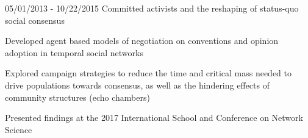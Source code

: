 \begin{cventries}
  \cventry
    {} %
    {} %
    {} %
    {05/01/2013 - 10/22/2015} %
    {Committed activists and the reshaping of status-quo social consensus}
    {
      \begin{cvitems} %
      	\item {Developed agent based models of negotiation on conventions and opinion adoption in temporal social networks}
        \item {Explored campaign strategies to reduce the time and critical mass needed to drive populations towards consensus, as well as the hindering effects of community structures (echo chambers)}
        \item {Presented findings at the 2017 International School and Conference on Network Science}
      \end{cvitems}
    }
\vspace{1mm}
\end{cventries}
